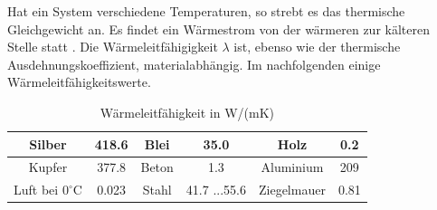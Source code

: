 Hat ein System verschiedene Temperaturen, so strebt es das thermische Gleichgewicht an. Es findet ein Wärmestrom von der wärmeren zur kälteren Stelle statt \cite{Lindner2006}. Die Wärmeleitfähigigkeit $\lambda$ ist, ebenso wie der thermische Ausdehnungskoeffizient, materialabhängig.
Im nachfolgenden einige Wärmeleitfähigkeitswerte.
\begin{table}[h]
\centering
\caption[Wärmeleitfähigkeit]{Wärmeleitfähigkeit in W/(mK)\protect\footnotemark}
	\begin{tabular}{|c|c||c|c||c|c|}
		\hline
		Silber & 418.6 & Blei & 35.0 & Holz & 0.2 \\
		\hline
		Kupfer & 377.8 & Beton & 1.3 & Aluminium & 209 \\
		\hline
		Luft bei $0^\circ\text{C}$ & 0.023 & Stahl & 41.7 ...55.6 & Ziegelmauer & 0.81 \\
	\hline
	\end{tabular}
\label{tab:wärmeleitfähigkeit}
\end{table}


